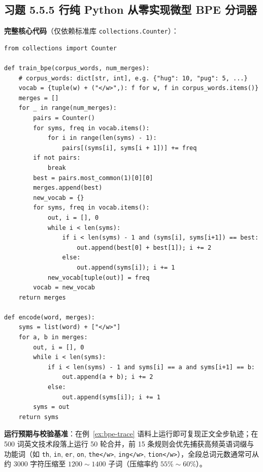 \subsection*{习题 5.5.5 行纯 Python 从零实现微型 BPE 分词器}
\textbf{完整核心代码}（仅依赖标准库 \texttt{collections.Counter}）：
\begin{lstlisting}
from collections import Counter

def train_bpe(corpus_words, num_merges):
    # corpus_words: dict[str, int], e.g. {"hug": 10, "pug": 5, ...}
    vocab = {tuple(w) + ("</w>",): f for w, f in corpus_words.items()}
    merges = []
    for _ in range(num_merges):
        pairs = Counter()
        for syms, freq in vocab.items():
            for i in range(len(syms) - 1):
                pairs[(syms[i], syms[i + 1])] += freq
        if not pairs:
            break
        best = pairs.most_common(1)[0][0]
        merges.append(best)
        new_vocab = {}
        for syms, freq in vocab.items():
            out, i = [], 0
            while i < len(syms):
                if i < len(syms) - 1 and (syms[i], syms[i+1]) == best:
                    out.append(best[0] + best[1]); i += 2
                else:
                    out.append(syms[i]); i += 1
            new_vocab[tuple(out)] = freq
        vocab = new_vocab
    return merges

def encode(word, merges):
    syms = list(word) + ["</w>"]
    for a, b in merges:
        out, i = [], 0
        while i < len(syms):
            if i < len(syms) - 1 and syms[i] == a and syms[i+1] == b:
                out.append(a + b); i += 2
            else:
                out.append(syms[i]); i += 1
        syms = out
    return syms
\end{lstlisting}
\textbf{运行预期与校验基准}：在例~\ref{ex:bpe-trace} 语料上运行即可复现正文全步轨迹；在 500 词英文技术段落上运行 50 轮合并，前 15 条规则会优先捕获高频英语词缀与功能词（如 \texttt{th}, \texttt{in}, \texttt{er}, \texttt{on}, \texttt{the</w>}, \texttt{ing</w>}, \texttt{tion</w>}），全段总词元数通常可从约 $3000$ 字符压缩至 $1200 \sim 1400$ 子词（压缩率约 $55\% \sim 60\%$）。

